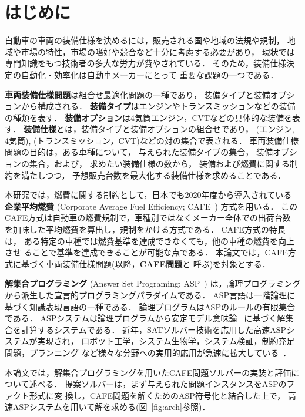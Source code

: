 \section{はじめに}\label{sec:introduction}

自動車の車両の装備仕様を決めるには，販売される国や地域の法規や規制，
地域や市場の特性，市場の嗜好や競合など十分に考慮する必要があり，
現状では専門知識をもつ技術者の多大な労力が費やされている．
そのため，装備仕様決定の自動化・効率化は自動車メーカーにとって
重要な課題の一つである．

\textbf{車両装備仕様問題}は組合せ最適化問題の一種であり，
装備タイプと装備オプションから構成される．
\textbf{装備タイプ}はエンジンやトランスミッションなどの装備の種類を表す．
\textbf{装備オプション}は4気筒エンジン，CVTなどの具体的な装備を表す．
\textbf{装備仕様}とは，装備タイプと装備オプションの組合せであり，
(エンジン, 4気筒), (トランスミッション，CVT)などの対の集合で表される．
車両装備仕様問題の目的は，ある車種について，
与えられた装備タイプの集合，
装備オプションの集合，および，
求めたい装備仕様の数から，
装備および燃費に関する制約を満たしつつ，
予想販売台数を最大化する装備仕様を求めることである．

本研究では，燃費に関する制約として，日本でも2020年度から導入されている
\textbf{企業平均燃費}
(Corporate Average Fuel Efficiency; CAFE~\cite{metimlit18:cafe})
方式を用いる．
このCAFE方式は自動車の燃費規制で，車種別ではなくメーカー全体での出荷台数
を加味した平均燃費を算出し，規制をかける方式である．
CAFE方式の特長は，
ある特定の車種では燃費基準を達成できなくても，他の車種の燃費を向上させ
ることで基準を達成できることが可能な点である．
本論文では，CAFE方式に基づく車両装備仕様問題(以降，\textbf{CAFE問題}と
呼ぶ)を対象とする．

\textbf{解集合プログラミング}
(Answer Set Programing; ASP~\cite{%
  Baral03:cambridge,%
  Gelfond88:iclp,%
  Inoue08:jssst})
は，論理プログラミングから派生した宣言的プログラミングパラダイムである．
ASP言語は一階論理に基づく知識表現言語の一種である．
論理プログラムはASPのルールの有限集合である．
ASPシステムは論理プログラムから安定モデル意味論~\cite{Gelfond88:iclp}
に基づく解集合を計算するシステムである．
近年，SATソルバー技術を応用した高速ASPシステムが実現され，
ロボット工学，システム生物学，システム検証，制約充足問題，プランニング
など様々な分野への実用的応用が急速に拡大している~\cite{Gelfond16:aim}．


本論文では，解集合プログラミングを用いたCAFE問題ソルバーの実装と評価に
ついて述べる．
提案ソルバーは，まず与えられた問題インスタンスをASPのファクト形式に変
換し，CAFE問題を解くためのASP符号化と結合した上で，
高速ASPシステムを用いて解を求める(図~\ref{fig:arch}参照)．

